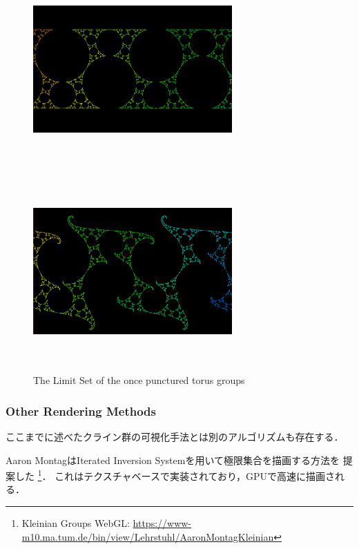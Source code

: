  \begin{figure}[htbp]
  \begin{minipage}{0.5\hsize}
   \center
   \includegraphics[width=3in, height=3in,
   keepaspectratio]{../img/klein/opt1N.pdf}
   \subcaption{}
  \end{minipage}
  \begin{minipage}{0.5\hsize}
   \center
   \includegraphics[width=3in, height=3in,
   keepaspectratio]{../img/klein/opt2N.pdf}
   \subcaption{}
  \end{minipage}
  \caption{The Limit Set of the once punctured torus groups}
  \label{fig:opt}
 \end{figure}

\subsubsection{Other Rendering Methods}

ここまでに述べたクライン群の可視化手法とは別のアルゴリズムも存在する．

Aaron MontagはIterated Inversion Systemを用いて極限集合を描画する方法を
提案した\cite{Montag2014hyperbolicIFS}
\footnote{Kleinian Groups WebGL:
 \url{https://www-m10.ma.tum.de/bin/view/Lehrstuhl/AaronMontagKleinian}}．
これはテクスチャベースで実装されており，GPUで高速に描画される．

